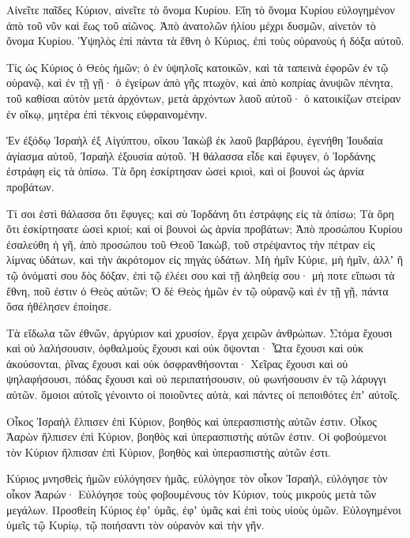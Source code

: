 \begin{spacing}{1.1}
\begin{multicols}{2}
Αἰνεῖτε παῖδες Κύριον, αἰνεῖτε τὸ ὄνομα Κυρίου.
Εἴη τὸ ὄνομα Κυρίου εὐλογημένον ἀπὸ τοῦ νῦν καὶ ἕως τοῦ αἰῶνος.
Ἀπὸ ἀνατολῶν ἡλίου μέχρι δυσμῶν, αἰνετὸν τὸ ὄνομα Κυρίου.
Ὑψηλὸς ἐπὶ πάντα τὰ ἔθνη ὁ Κύριος, ἐπὶ τοὺς οὐρανοὺς ἡ δόξα αὐτοῦ.

Τίς ὡς Κύριος ὁ Θεὸς ἡμῶν; ὁ ἐν ὑψηλοῖς κατοικῶν,
καὶ τὰ ταπεινὰ ἐφορῶν ἐν τῷ οὐρανῷ, καὶ ἐν τῇ γῇ·
ὁ ἐγείρων ἀπὸ γῆς πτωχὸν, καὶ ἀπὸ κοπρίας ἀνυψῶν πένητα,
τοῦ καθίσαι αὐτὸν μετὰ ἀρχόντων, μετὰ ἀρχόντων λαοῦ αὐτοῦ·
ὁ κατοικίζων στείραν ἐν οἴκῳ, μητέρα ἐπὶ τέκνοις εὐφραινομένην.

Ἐν ἐξόδῳ Ἰσραὴλ ἐξ Αἰγύπτου, οἴκου Ἰακὼβ ἐκ λαοῦ βαρβάρου,
ἐγενήθη Ἰουδαία ἁγίασμα αὐτοῦ, Ἰσραὴλ ἐξουσία αὐτοῦ.
Ἡ θάλασσα εἶδε καὶ ἔφυγεν, ὁ Ἰορδάνης ἐστράφη εἰς τὰ ὀπίσω.
Τὰ ὄρη ἐσκίρτησαν ὡσεὶ κριοὶ, καὶ οἱ βουνοὶ ὡς ἀρνία προβάτων.

Τί σοι ἐστὶ θάλασσα ὅτι ἔφυγες; καὶ σὺ Ἰορδάνη ὅτι ἐστράφης εἰς τὰ ὀπίσω;
Τὰ ὄρη ὅτι ἐσκίρτησατε ὡσεὶ κριοί; καὶ οἱ βουνοὶ ὡς ἀρνία προβάτων;
Ἀπὸ προσώπου Κυρίου ἐσαλεύθη ἡ γῆ, ἀπὸ προσώπου τοῦ Θεοῦ Ἰακὼβ,
τοῦ στρέψαντος τὴν πέτραν εἰς λίμνας ὑδάτων, καὶ τὴν ἀκρότομον εἰς πηγὰς ὑδάτων.
Μὴ ἡμῖν Κύριε, μὴ ἡμῖν, ἀλλʼ ἢ τῷ ὀνόματί σου δὸς δόξαν, ἐπὶ τῷ ἐλέει σου καὶ τῇ ἀληθείᾳ σου·
μή ποτε εἴπωσι τὰ ἔθνη, ποῦ ἐστιν ὁ Θεὸς αὐτῶν;
Ὁ δὲ Θεὸς ἡμῶν ἐν τῷ οὐρανῷ καὶ ἐν τῇ γῇ, πάντα ὅσα ἠθέλησεν ἐποίησε.

Τὰ εἴδωλα τῶν ἐθνῶν, ἀργύριον καὶ χρυσίον, ἔργα χειρῶν ἀνθρώπων.
Στόμα ἔχουσι καὶ οὐ λαλήσουσιν, ὀφθαλμοὺς ἔχουσι καὶ οὐκ ὄψονται·
Ὦτα ἔχουσι καὶ οὐκ ἀκούσονται, ῥῖνας ἔχουσι καὶ οὐκ ὀσφρανθήσονται·
Χεῖρας ἔχουσι καὶ οὐ ψηλαφήσουσι, πόδας ἔχουσι καὶ οὐ περιπατήσουσιν, οὐ φωνήσουσιν ἐν τῷ λάρυγγι αὐτῶν.
ὅμοιοι αὐτοῖς γένοιντο οἱ ποιοῦντες αὐτὰ, καὶ πάντες οἱ πεποιθότες ἐπʼ αὐτοῖς.

Οἶκος Ἰσραὴλ ἔλπισεν ἐπὶ Κύριον, βοηθὸς καὶ ὑπερασπιστὴς αὐτῶν ἐστιν.
Οἶκος Ἀαρὼν ἤλπισεν ἐπὶ Κύριον, βοηθὸς καὶ ὑπερασπιστὴς αὐτῶν ἐστιν.
Οἱ φοβούμενοι τὸν Κύριον ἤλπισαν ἐπὶ Κύριον, βοηθὸς καὶ ὑπερασπιστὴς αὐτῶν ἐστι.

Κύριος μνησθεὶς ἡμῶν εὐλόγησεν ἡμᾶς, εὐλόγησε τὸν οἶκον Ἰσραὴλ, εὐλόγησε τὸν οἶκον Ἀαρών·
Εὐλόγησε τοὺς φοβουμένους τὸν Κύριον, τοὺς μικροὺς μετὰ τῶν μεγάλων.
Προσθείη Κύριος ἐφʼ ὑμᾶς, ἐφʼ ὑμᾶς καὶ ἐπὶ τοὺς υἱοὺς ὑμῶν.
Εὐλογημένοι ὑμεῖς τῷ Κυρίῳ, τῷ ποιήσαντι τὸν οὐρανὸν καὶ τὴν γῆν.


\end{multicols}
\end{spacing}
